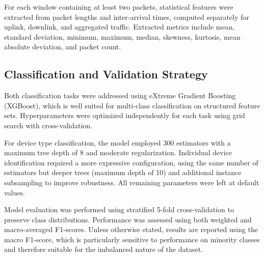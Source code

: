 For each window containing at least two packets, statistical features were extracted from packet lengths and inter-arrival times, computed separately for uplink, downlink, and aggregated traffic. Extracted metrics include mean, standard deviation, minimum, maximum, median, skewness, kurtosis, mean absolute deviation, and packet count.

\subsection{Classification and Validation Strategy}
\label{subsec:classifier}
Both classification tasks were addressed using eXtreme Gradient Boosting (XGBoost), which is well suited for multi-class classification on structured feature sets. Hyperparameters were optimized independently for each task using grid search with cross-validation.

For device type classification, the model employed 300 estimators with a maximum tree depth of 8 and moderate regularization. Individual device identification required a more expressive configuration, using the same number of estimators but deeper trees (maximum depth of 10) and additional instance subsampling to improve robustness. All remaining parameters were left at default values.

Model evaluation was performed using stratified 5-fold cross-validation to preserve class distributions. Performance was assessed using both weighted and macro-averaged F1-scores. Unless otherwise stated, results are reported using the macro F1-score, which is particularly sensitive to performance on minority classes and therefore suitable for the imbalanced nature of the dataset.
